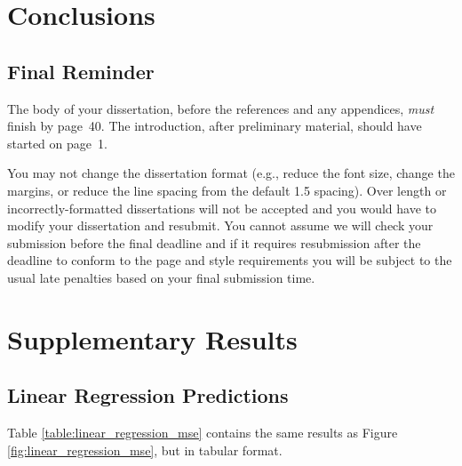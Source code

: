 \documentclass[msc,deptreport.inf]{infthesis} %
\begin{document}
\chapter{Conclusions}

\section{Final Reminder}

The body of your dissertation, before the references and any appendices,
\emph{must} finish by page~40. The introduction, after preliminary material,
should have started on page~1.

You may not change the dissertation format (e.g., reduce the font
size, change the margins, or reduce the line spacing from the default
1.5 spacing). Over length or incorrectly-formatted dissertations will
not be accepted and you would have to modify your dissertation and
resubmit.  You cannot assume we will check your submission before the
final deadline and if it requires resubmission after the deadline to
conform to the page and style requirements you will be subject to the
usual late penalties based on your final submission time.




 \appendix

 \chapter{Supplementary Results}

 \section{Linear Regression Predictions}\label{appendix:linear_regression_predictions}
 
 Table \ref{table:linear_regression_mse} contains the same results as Figure \ref{fig:linear_regression_mse}, but in tabular format.  
 
\end{document}
